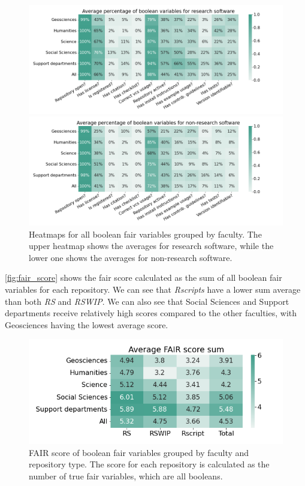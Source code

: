 \begin{figure}[h!]
\centerline{
\includegraphics[scale=0.53]{figures_results/heatmap_fair_booleans.png}}
\vspace{-0.5cm}
\centerline{
\includegraphics[scale=0.53]{figures_results/heatmap_fair_booleans_non_rs.png}}

\caption{Heatmaps for all boolean \acrshort{fair} variables grouped by faculty. The upper heatmap shows the averages for research software, while the lower one shows the averages for non-research software.
\label{fig:heatmap_fair_booleans}}
\end{figure}

\newpage
\autoref{fig:fair_score} shows the \acrshort{fair} score calculated as the sum of all boolean \acrshort{fair} variables for each repository. We can see that \textit{Rscripts} have a lower sum average than both \textit{RS} and \textit{RSWIP}. We can also see that Social Sciences and Support departments receive relatively high scores compared to the other faculties, with Geosciences having the lowest average score.

\begin{figure}[tbph!]
\centerline{
\includegraphics[scale=0.5]{figures_results/heatmap_fair_score.png}}
\vspace{-0.3cm}
\caption{FAIR score of boolean \acrshort{fair} variables grouped by faculty and repository type. The score for each repository is calculated as the number of true \acrshort{fair} variables, which are all booleans. 
\label{fig:fair_score}}
\end{figure}


